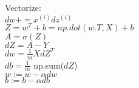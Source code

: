\documentclass{article}
\begin{document}
Vectorize:\\

$dw += x^{(i)}dz^{(i)}$\\

$Z = w^T + b = np.dot(w.T,X) + b$\\

$A = \sigma(Z)$\\

$dZ = A-Y$\\

$dw = \frac{1}{m} X dZ^T$\\

$db = \frac{1}{m}$ np.sum($dZ$)\\

$w := w-\alpha dw$\\

$b := b-\alpha db$\\

\newpage
\subsection{}
\end{document}
